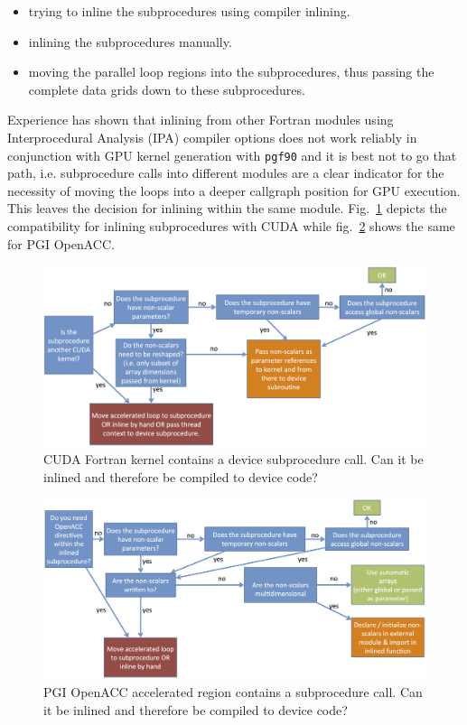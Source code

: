 \begin{itemize}
 \item trying to inline the subprocedures using compiler inlining.
 \item inlining the subprocedures manually.
 \item moving the parallel loop regions into the subprocedures, thus passing the complete data grids down to these subprocedures.
\end{itemize}

Experience has shown that inlining from other Fortran modules using Interprocedural Analysis (IPA) compiler options does not work reliably in conjunction with GPU kernel generation with \verb|pgf90| and it is best not to go that path, i.e. subprocedure calls into different modules are a clear indicator for the necessity of moving the loops into a deeper callgraph position for GPU execution. This leaves the decision for inlining within the same module. Fig.~\ref{figure:subprocUsabilityCUDA} depicts the compatibility for inlining subprocedures with CUDA while fig.~\ref{figure:subprocUsabilityOpenACC} shows the same for PGI OpenACC.

\begin{figure}[htpb]
	\centering
	\includegraphics[width=14cm]{figures/subprocUsabilityCUDA}
	\caption[Subprocedure Inlining in CUDA Fortran]{CUDA Fortran kernel contains a device subprocedure call. Can it be inlined and therefore be compiled to device code?}
	\label{figure:subprocUsabilityCUDA}
\end{figure}

\begin{figure}[htpb]
	\centering
	\includegraphics[width=14cm]{figures/subprocUsabilityOpenACC}
	\caption[Subprocedure Inlining in OpenACC]{PGI OpenACC accelerated region contains a subprocedure call. Can it be inlined and therefore be compiled to device code?}
	\label{figure:subprocUsabilityOpenACC}
\end{figure}

